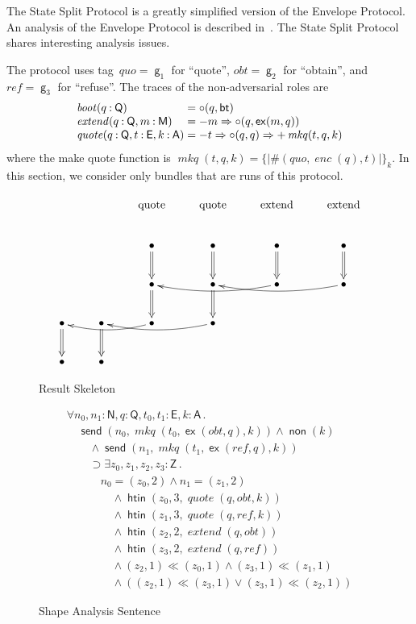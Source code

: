 \documentclass[12pt]{article}
\newcommand{\cn}[1]{\ensuremath{\operatorname{\mathsf{#1}}}}
\newcommand{\fn}[1]{\ensuremath{\operatorname{\mathit{#1}}}}
\newcommand{\srt}[1]{\ensuremath{\mathsf{#1}}}
\newcommand{\gtag}[1]{\ensuremath{\mathit{#1}}}
\newcommand{\typ}{\mathbin:}
\newcommand{\enc}[2]{\ensuremath{\{\!|#1|\!\}_{#2}}}
\newcommand{\inbnd}{\mathord -}
\newcommand{\outbnd}{\mathord +}
\newcommand{\neutral}{\mathord\circ}
\newcommand{\all}[1]{\forall#1\mathpunct.}
\newcommand{\some}[1]{\exists#1\mathpunct.}
\newcommand{\boot}{\cn{bt}}
\newcommand{\extend}{\cn{ex}}
\newcommand{\encode}{\fn{enc}}
\begin{document}
The State Split Protocol is a greatly simplified version of the
Envelope Protocol.  An analysis of the Envelope Protocol is described
in~\cite{RamsdellEtAl14}.  The State Split Protocol shares interesting
analysis issues.

The protocol uses tag~$\gtag{quo}=\cn{g}_1$ for ``quote'',
$\gtag{obt}=\cn{g}_2$ for ``obtain'', and $\gtag{ref}=\cn{g}_3$ for
``refuse''.  The traces of the non-adversarial roles are
\[
\begin{array}{l@{{}={}}l}
\fn{boot}(q\typ\srt{Q})&\neutral(q,\boot)\\
\fn{extend}(q\typ\srt{Q}, m\typ\srt{M})&
\inbnd m\Rightarrow\neutral(q,\extend(m, q))\\
\fn{quote}(q\typ\srt{Q}, t\typ\srt{E},k\typ\srt{A})&
\inbnd t\Rightarrow\neutral(q, q)\Rightarrow
\outbnd\fn{mkq}(t,q,k)
\end{array}
\]
where the make quote function is $\fn{mkq}(t,q,k)=\enc{\#(\gtag{quo},
  \encode(q), t)}{k}$.  In this section, we consider only bundles
that are runs of this protocol.

\begin{figure}
$$\xymatrix{
\txt{\strut }&\txt{\strut }&\txt{\strut quote}&\txt{\strut quote}&\txt{\strut extend}&\txt{\strut extend}\\
&&\bullet\ar@{=>}[d]&\bullet\ar@{=>}[d]&\bullet\ar@{=>}[d]&\bullet\ar@{=>}[d]\\
&&\bullet\ar@{=>}[d]&\bullet\ar@{=>}[d]&\bullet\ar@/^/[ll]&\bullet\ar@/^/[ll]\\
\bullet\ar@{=>}[d]&\bullet\ar@{=>}[d]&\bullet\ar@/^/[ll]&\bullet\ar@/^/[ll]&&\\
\bullet&\bullet&&&&}$$
\caption{Result Skeleton}\label{fig:result}
\end{figure}

\begin{figure}
\[
\begin{array}{l}
\all{n_0, n_1\typ\srt{N}, q\typ\srt{Q}, t_0,t_1\typ\srt{E},
k\typ\srt{A}}\\
\quad\cn{send}(n_0, \fn{mkq}(t_0, \extend(\gtag{obt}, q),k))\land\cn{non}(k)\\
\qquad\land\cn{send}(n_1, \fn{mkq}(t_1, \extend(\gtag{ref}, q),k))
\\
\qquad\supset\some{z_0,z_1,z_2, z_3\typ\srt{Z}}\\
\qquad\quad n_0=(z_0,2)\land n_1=(z_1,2)\\
\qquad\qquad{}\land\cn{htin}(z_0, 3, \fn{quote}(q,\gtag{obt}, k))\\
\qquad\qquad{}\land\cn{htin}(z_1, 3, \fn{quote}(q,\gtag{ref}, k))\\
\qquad\qquad{}\land\cn{htin}(z_2, 2, \fn{extend}(q,\gtag{obt}))\\
\qquad\qquad{}\land\cn{htin}(z_3, 2, \fn{extend}(q,\gtag{ref}))\\
\qquad\qquad{}\land(z_2,1)\ll(z_0,1)
\land(z_3,1)\ll(z_1,1)\\
\qquad\qquad{}\land((z_2,1)\ll(z_3,1)\lor(z_3,1)\ll(z_2,1))
\end{array}
\]
\caption{Shape Analysis Sentence}\label{fig:sas}
\end{figure}
\end{document}
